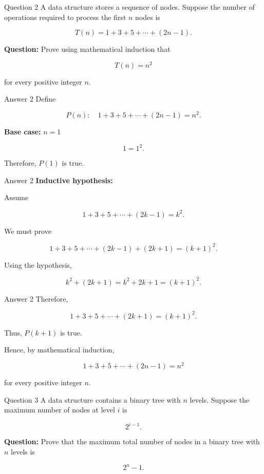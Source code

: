 
\begin{frame}{Question 2}
A data structure stores a sequence of nodes. Suppose the number of
operations required to process the first $n$ nodes is

$$
T(n)=1+3+5+\cdots+(2n-1).
$$

\textbf{Question:} Prove using mathematical induction that

$$
T(n)=n^2
$$

for every positive integer $n$.
\end{frame}

\begin{frame}{Answer 2}
Define

$$
P(n):\quad
1+3+5+\cdots+(2n-1)=n^2.
$$

\textbf{Base case:} $n=1$

$$
1=1^2.
$$

Therefore, $P(1)$ is true.
\end{frame}

\begin{frame}{Answer 2}
\textbf{Inductive hypothesis:}

Assume

$$
1+3+5+\cdots+(2k-1)=k^2.
$$

We must prove

$$
1+3+5+\cdots+(2k-1)+(2k+1)
=
(k+1)^2.
$$

Using the hypothesis,

$$
k^2+(2k+1)
=
k^2+2k+1
=
(k+1)^2.
$$

\end{frame}

\begin{frame}{Answer 2}
Therefore,

$$
1+3+5+\cdots+(2k+1)
=
(k+1)^2.
$$

Thus, $P(k+1)$ is true.

Hence, by mathematical induction,

$$
\boxed{
1+3+5+\cdots+(2n-1)=n^2
}
$$

for every positive integer $n$.
\end{frame}


\begin{frame}{Question 3}
A data structure contains a binary tree with $n$ levels. Suppose the maximum
number of nodes at level $i$ is

$$
2^{i-1}.
$$

\textbf{Question:} Prove that the maximum total number of nodes in a binary
tree with $n$ levels is

$$
2^n-1.
$$

\end{frame}

